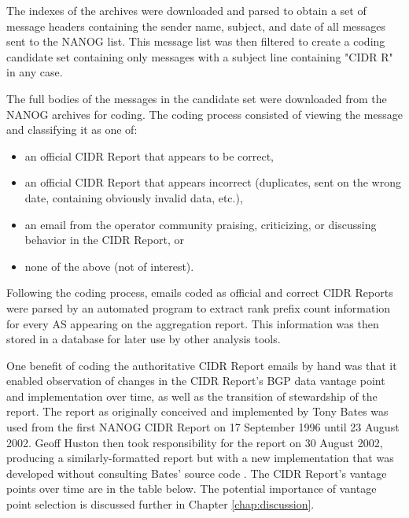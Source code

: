 The indexes of the archives were downloaded and parsed to obtain a set of message headers containing the sender name, subject, and date of all messages sent to the NANOG list. This message list was then filtered to create a coding candidate set containing only messages with a subject line containing "CIDR R" in any case.

The full bodies of the messages in the candidate set were downloaded from the NANOG archives for coding. The coding process consisted of viewing the message and classifying it as one of:

\begin{itemize}
\item{an official CIDR Report that appears to be correct,}
\item{an official CIDR Report that appears incorrect (duplicates, sent on the wrong date, containing obviously invalid data, etc.),}
\item{an email from the operator community praising, criticizing, or discussing behavior in the CIDR Report, or}
\item{none of the above (not of interest).}
\end{itemize}

Following the coding process, emails coded as official and correct CIDR Reports were parsed by an automated program to extract rank prefix count information for every AS appearing on the aggregation report. This information was then stored in a database for later use by other analysis tools.

One benefit of coding the authoritative CIDR Report emails by hand was that it enabled observation of changes in the CIDR Report's BGP data vantage point and implementation over time, as well as the transition of stewardship of the report. The report as originally conceived and implemented by Tony Bates was used from the first NANOG CIDR Report on 17 September 1996 until 23 August 2002. Geoff Huston then took responsibility for the report on 30 August 2002, producing a similarly-formatted report but with a new implementation that was developed without consulting Bates' source code \cite{Huston:2011ys}. The CIDR Report's vantage points over time are in the table below. The potential importance of vantage point selection is discussed further in Chapter \ref{chap:discussion}.

